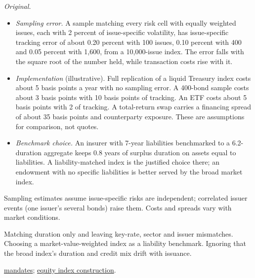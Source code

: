 \begin{qfmethod}
 \emph{Original.}
\begin{itemize}
\item \emph{Sampling error.} A sample matching every risk cell with equally weighted issues, each with 2 percent of issue-specific volatility, has issue-specific tracking error of about 0.20 percent with 100 issues, 0.10 percent with 400 and 0.05 percent with 1{,}600, from a 10{,}000-issue index. The error falls with the square root of the number held, while transaction costs rise with it.
\item \emph{Implementation} (illustrative). Full replication of a liquid Treasury index costs about 5 basis points a year with no sampling error. A 400-bond sample costs about 3 basis points with 10 basis points of tracking. An ETF costs about 5 basis points with 2 of tracking. A total-return swap carries a financing spread of about 35 basis points and counterparty exposure. These are assumptions for comparison, not quotes.
\item \emph{Benchmark choice.} An insurer with 7-year liabilities benchmarked to a 6.2-duration aggregate keeps 0.8 years of surplus duration on assets equal to liabilities. A liability-matched index is the justified choice there; an endowment with no specific liabilities is better served by the broad market index.
\end{itemize}

 Sampling estimates assume issue-specific risks are independent; correlated issuer events (one issuer's several bonds) raise them. Costs and spreads vary with market conditions.

 Matching duration only and leaving key-rate, sector and issuer mismatches. Choosing a market-value-weighted index as a liability benchmark. Ignoring that the broad index's duration and credit mix drift with issuance.

 \hyperref[def:fixed-income-mandates-return-model]{mandates}; \hyperref[meth:index-equity-portfolio-construction]{equity index construction}.

\end{qfmethod}

